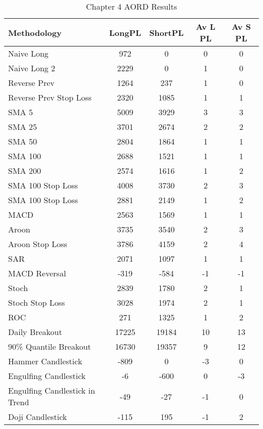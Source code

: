 \begin{table}[ht]
\centering
\caption[Chapter 4 AORD Results]{Chapter 4 AORD Results} 
\label{tab:chp6:aord_summary}
\begin{tabular}{lcccc}
  \toprule Methodology & LongPL & ShortPL & Av L PL & Av S PL \\ 
  \midrule Naive Long & 972 & 0 & 0 & 0 \\ 
  Naive Long 2 & 2229 & 0 & 1 & 0 \\ 
  Reverse Prev & 1264 & 237 & 1 & 0 \\ 
  Reverse Prev Stop Loss & 2320 & 1085 & 1 & 1 \\ 
  SMA 5 & 5009 & 3929 & 3 & 3 \\ 
  SMA 25 & 3701 & 2674 & 2 & 2 \\ 
  SMA 50 & 2804 & 1864 & 1 & 1 \\ 
  SMA 100 & 2688 & 1521 & 1 & 1 \\ 
  SMA 200 & 2574 & 1616 & 1 & 2 \\ 
  SMA 100 Stop Loss & 4008 & 3730 & 2 & 3 \\ 
  SMA 100 Stop Loss & 2881 & 2149 & 1 & 2 \\ 
  MACD & 2563 & 1569 & 1 & 1 \\ 
  Aroon & 3735 & 3540 & 2 & 3 \\ 
  Aroon Stop Loss & 3786 & 4159 & 2 & 4 \\ 
  SAR & 2071 & 1097 & 1 & 1 \\ 
  MACD Reversal & -319 & -584 & -1 & -1 \\ 
  Stoch & 2839 & 1780 & 2 & 1 \\ 
  Stoch Stop Loss & 3028 & 1974 & 2 & 1 \\ 
  ROC & 271 & 1325 & 1 & 2 \\ 
  Daily Breakout & 17225 & 19184 & 10 & 13 \\ 
  90\% Quantile Breakout & 16730 & 19357 & 9 & 12 \\ 
  Hammer Candlestick & -809 & 0 & -3 & 0 \\ 
  Engulfing Candlestick & -6 & -600 & 0 & -3 \\ 
  Engulfing Candlestick in Trend & -49 & -27 & -1 & 0 \\ 
  Doji Candlestick & -115 & 195 & -1 & 2 \\ 
   \bottomrule \end{tabular}
\end{table}
